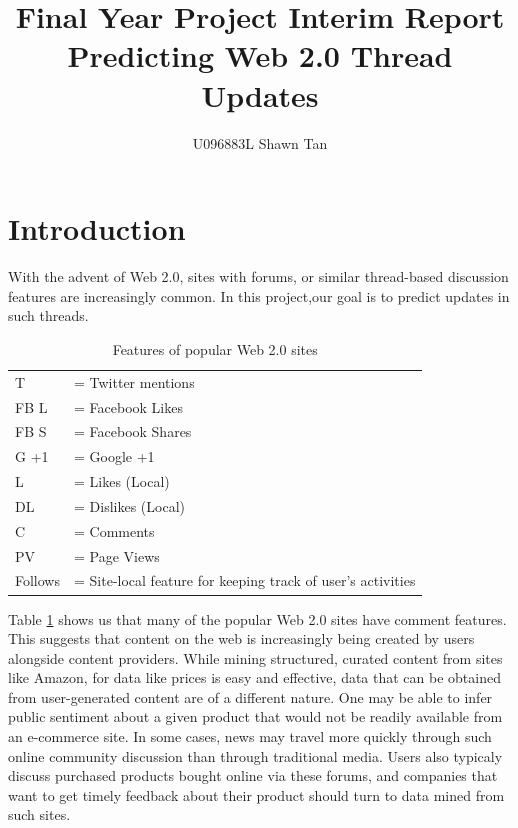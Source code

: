 \documentclass[12 pt]{article}
\title{Final Year Project Interim Report\\ Predicting Web 2.0 Thread Updates}
\author{U096883L Shawn Tan}
\date{}
\begin{document}
\doublespacing
\maketitle
\section{Introduction}
With the advent of Web 2.0, sites with forums, or similar thread-based discussion features are increasingly common.
In this project,our goal is to predict updates in such threads.



\begin{table}\label{table:web20}
	{\footnotesize
\caption{Features of popular Web 2.0 sites}
	\begin{tabular}{l l}
		T &= Twitter mentions\\
	 FB L &= Facebook Likes \\
		FB S &= Facebook Shares\\
	G +1 &= Google +1\\
		   L&= Likes (Local) \\
   		DL &= Dislikes (Local) \\
			C &= Comments \\
		PV &= Page Views \\
   Follows &= Site-local feature for keeping track of user's activities
	\end{tabular}
}
\end{table}

Table \ref{table:web20} shows us that many of the popular Web 2.0 sites have comment features. This suggests that content on the web is increasingly being created by users alongside content providers. While mining structured, curated content from sites like Amazon, for data like prices is easy and effective, data that can be obtained from user-generated content are of a different nature. One may be able to infer public sentiment about a given product that would not be readily available from an e-commerce site.
In some cases, news may travel more quickly through such online community discussion than through traditional media. Users also typicaly discuss purchased products bought online via these forums, and companies that want to get timely feedback about their product should turn to data mined from such sites.
\end{document}
